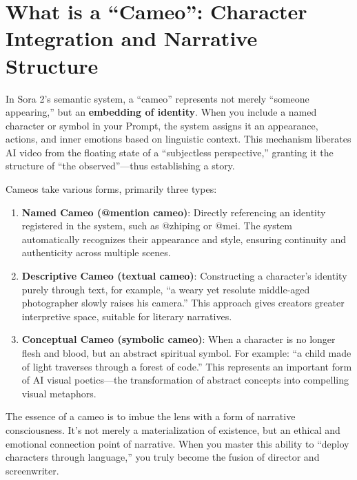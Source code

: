 \section{What is a ``Cameo'': Character Integration and Narrative Structure}
\label{sec:cameo-definition}

In Sora 2's semantic system, a ``cameo'' represents not merely ``someone appearing,'' but an \textbf{embedding of identity}. When you include a named character or symbol in your Prompt, the system assigns it an appearance, actions, and inner emotions based on linguistic context. This mechanism liberates AI video from the floating state of a ``subjectless perspective,'' granting it the structure of ``the observed''—thus establishing a story.

Cameos take various forms, primarily three types:

\begin{enumerate}
\item \textbf{Named Cameo (@mention cameo)}: Directly referencing an identity registered in the system, such as @zhiping or @mei. The system automatically recognizes their appearance and style, ensuring continuity and authenticity across multiple scenes.

\item \textbf{Descriptive Cameo (textual cameo)}: Constructing a character's identity purely through text, for example, ``a weary yet resolute middle-aged photographer slowly raises his camera.'' This approach gives creators greater interpretive space, suitable for literary narratives.

\item \textbf{Conceptual Cameo (symbolic cameo)}: When a character is no longer flesh and blood, but an abstract spiritual symbol. For example: ``a child made of light traverses through a forest of code.'' This represents an important form of AI visual poetics—the transformation of abstract concepts into compelling visual metaphors.
\end{enumerate}

The essence of a cameo is to imbue the lens with a form of narrative consciousness. It's not merely a materialization of existence, but an ethical and emotional connection point of narrative. When you master this ability to ``deploy characters through language,'' you truly become the fusion of director and screenwriter.

